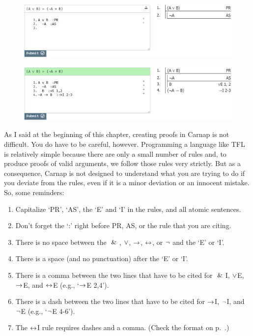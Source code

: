 \begin{figure}[h]
\includegraphics[width=13cm]{textbook--2a.PNG}
\caption{}
\label{fig:proof-2a}
\end{figure}

\begin{figure}[h]
\includegraphics[width=13cm]{textbook--2b.PNG}
\caption{}
\label{fig:proof-2b}
\end{figure}

As I said at the beginning of this chapter, creating proofs in Carnap is not difficult. You do have to be careful, however. Programming a language like TFL is relatively simple because there are only a small number of rules and, to produce proofs of valid arguments, we follow those rules very strictly. But as a consequence, Carnap is not designed to understand what you are trying to do if you deviate from the rules, even if it is a minor deviation or an innocent mistake. So, some reminders:
\begin{enumerate}
\itemsep-.3mm
	\item Capitalize `PR', `AS', the `E' and `I' in the rules, and all atomic sentences.
	\item Don't forget the `:' right before PR, AS, or the rule that you are citing. 
	\item There is no space between the $~\&~$, $\vee$, $\rightarrow$, $\leftrightarrow$, or ${\neg}$ and the `E' or `I'.  
	\item There is a space (and no punctuation) after the `E' or `I'. 
	\item There is a comma between the two lines that have to be cited for $~\&~$I, $\vee$E, $\rightarrow$E, and $\leftrightarrow$E (e.g., `$\rightarrow$E 2,4').
	\item There is a dash between the two lines that have to be cited for $\rightarrow$I, ${\neg}$I, and ${\neg}$E (e.g., `${\neg}$E 4-6').
	\item The $\leftrightarrow$I rule requires dashes and a comma. (Check the format on p.~\pageref{eiff-I}.)
\end{enumerate}





